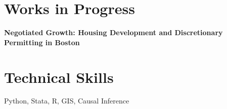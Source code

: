 \documentclass[11pt]{article}
\begin{document}
\section*{Works in Progress}
\textbf{Negotiated Growth: Housing Development and Discretionary Permitting in Boston}



\section*{Technical Skills}
Python, Stata, R, GIS, Causal Inference

\end{document}
